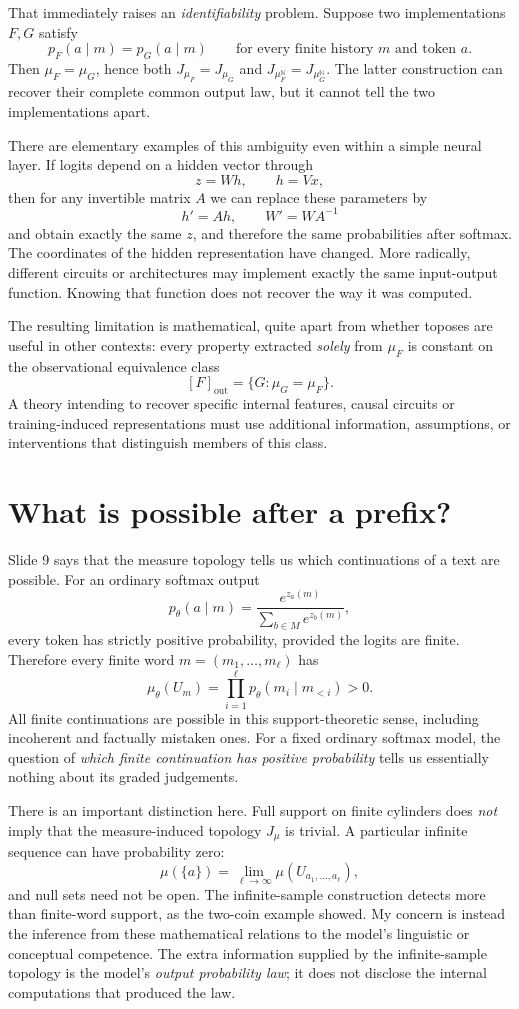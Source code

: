That immediately raises an \emph{identifiability} problem. Suppose two implementations \(F,G\) satisfy
\[
 p_F(a\mid m)=p_G(a\mid m)
 \qquad
 \text{for every finite history }m\text{ and token }a.
\]
Then \(\mu_F=\mu_G\), hence both \(J_{\mu_F}=J_{\mu_G}\) and
\(J_{\mu_F^{\mathbb N}}=J_{\mu_G^{\mathbb N}}\). The latter construction can recover their complete common output law, but it cannot tell the two implementations apart.

There are elementary examples of this ambiguity even within a simple neural layer. If logits depend on a hidden vector through
\[
 z=Wh,\qquad h=Vx,
\]
then for any invertible matrix \(A\) we can replace these parameters by
\[
 h'=Ah,\qquad W'=WA^{-1}
\]
and obtain exactly the same \(z\), and therefore the same probabilities after softmax. The coordinates of the hidden representation have changed. More radically, different circuits or architectures may implement exactly the same input-output function. Knowing that function does not recover the way it was computed.

The resulting limitation is mathematical, quite apart from whether toposes are useful in other contexts: every property extracted \emph{solely} from \(\mu_F\) is constant on the observational equivalence class
\[
 [F]_{\mathrm{out}}
 =\{G:\mu_G=\mu_F\}.
\]
A theory intending to recover specific internal features, causal circuits or training-induced representations must use additional information, assumptions, or interventions that distinguish members of this class.

\section{What is possible after a prefix?}

Slide 9 says that the measure topology tells us which continuations of a text are possible. For an ordinary softmax output
\[
 p_\theta(a\mid m)
 =\frac{e^{z_a(m)}}{\sum_{b\in M}e^{z_b(m)}},
\]
every token has strictly positive probability, provided the logits are finite. Therefore every finite word \(m=(m_1,\ldots,m_\ell)\) has
\[
 \mu_\theta(U_m)
 =\prod_{i=1}^{\ell}p_\theta(m_i\mid m_{<i})>0.
\]
All finite continuations are possible in this support-theoretic sense, including incoherent and factually mistaken ones. For a fixed ordinary softmax model, the question of \emph{which finite continuation has positive probability} tells us essentially nothing about its graded judgements.

There is an important distinction here. Full support on finite cylinders does \emph{not} imply that the measure-induced topology \(J_\mu\) is trivial. A particular infinite sequence can have probability zero:
\[
 \mu(\{a\})
 =\lim_{\ell\to\infty}\mu(U_{a_1,\ldots,a_\ell}),
\]
and null sets need not be open. The infinite-sample construction detects more than finite-word support, as the two-coin example showed. My concern is instead the inference from these mathematical relations to the model's linguistic or conceptual competence. The extra information supplied by the infinite-sample topology is the model's \emph{output probability law}; it does not disclose the internal computations that produced the law.

